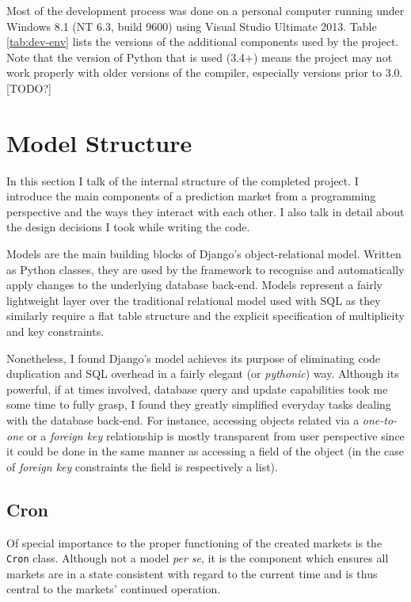 \documentclass[bsc,frontabs,twoside,singlespacing,parskip,deptreport]{infthesis}     %
\begin{document}
	Most of the development process was done on a personal computer running under Windows 8.1 (NT 6.3, build 9600) using Visual Studio Ultimate 2013. Table \ref{tab:dev-env} lists the versions of the additional components used by the project. Note that the version of Python that is used (3.4+) means the project may not work properly with older versions of the compiler, especially versions prior to $3.0$. [TODO?]


\section{Model Structure}

In this section I talk of the internal structure of the completed project. I introduce the main components of a prediction market from a programming perspective and the ways they interact with each other. I also talk in detail about the design decisions I took while writing the code.

    Models are the main building blocks of Django's object-relational model. Written as Python classes, they are used by the framework to recognise and automatically apply changes to the underlying database back-end. Models represent a fairly lightweight layer over the traditional relational model used with SQL as they similarly require a flat table structure and the explicit specification of multiplicity and key constraints. 

	Nonetheless, I found Django’s model achieves its purpose of eliminating code duplication and SQL overhead in a fairly elegant (or {\em pythonic}) way. Although its powerful, if at times involved, database query and update capabilities took me some time to fully grasp, I found they greatly simplified everyday tasks dealing with the database back-end. For instance, accessing objects related via a {\it one-to-one} or a {\it foreign key} relationship is mostly transparent from user perspective since it could be done in the same manner as accessing a field of the object (in the case of {\it foreign key} constraints the field is respectively a list). 

\subsection{Cron}

	Of special importance to the proper functioning of the created markets is the {\tt Cron} class. Although not a model {\it per se}, it is the component which ensures all markets are in a state consistent with regard to the current time and is thus central to the markets' continued operation. 
\end{document}
